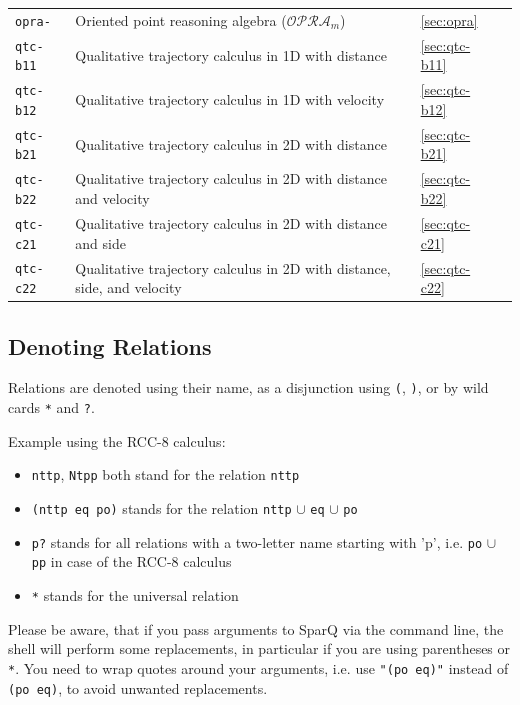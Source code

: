\documentclass[headsepline]{scrreprt}
\theoremstyle{definition}
\newcommand{\engine}{SparQ}
\newcommand{\opra}{$\mathcal{OPRA}_m$}
\begin{document}
\begin{center}
\begin{longtable}{|p{4cm}p{6cm}ll|}
	{\tt opra-} & Oriented point reasoning algebra (\opra{})\citep{moratz06_opra} & \ref{sec:opra} & \pageref{sec:opra}\\
	{\tt qtc-b11} & Qualitative trajectory calculus in 1D with distance \citep{Weghe04_PhD} & \ref{sec:qtc-b11} & \pageref{sec:qtc-b11}\\
	{\tt qtc-b12} & Qualitative trajectory calculus in 1D with velocity \citep{Weghe04_PhD} & \ref{sec:qtc-b12} & \pageref{sec:qtc-b12}\\
	{\tt qtc-b21} & Qualitative trajectory calculus in 2D with distance \citep{Weghe04_PhD} & \ref{sec:qtc-b21} & \pageref{sec:qtc-b21}\\
	{\tt qtc-b22} & Qualitative trajectory calculus in 2D with distance and velocity \citep{Weghe04_PhD} & \ref{sec:qtc-b22} & \pageref{sec:qtc-b22}\\
	{\tt qtc-c21} & Qualitative trajectory calculus in 2D with distance and side \citep{Weghe04_PhD} & \ref{sec:qtc-c21} & \pageref{sec:qtc-c21}\\
	{\tt qtc-c22} & Qualitative trajectory calculus in 2D with distance, side, and velocity \citep{Weghe04_PhD} & \ref{sec:qtc-c22} & \pageref{sec:qtc-c22}\\
	\hline
\end{longtable}
\end{center}
\renewcommand{\arraystretch}{1.0}


\subsection{Denoting Relations}
Relations are denoted using their name, as a disjunction using {\tt (}, {\tt )}, or by wild cards \verb=*= and \verb=?=.

\noindent Example using the RCC-8 calculus:\\
\begin{itemize}
	\item \verb=nttp=, \verb=Ntpp= both stand for the relation \verb=nttp=
	\item \verb=(nttp eq po)= stands for the relation \verb=nttp= $\cup$  \verb=eq= $\cup$  \verb=po=
	\item \verb=p?= stands for all relations with a two-letter name starting with 'p', i.e. \verb=po= $\cup$  \verb=pp= in case of the RCC-8 calculus
	\item \verb=*= stands for the universal relation
\end{itemize}

Please be aware, that if you pass arguments to \engine{} via the command line, the shell will perform some replacements, in particular if you are using parentheses or \verb=*=. You need to wrap quotes around your arguments, i.e. use \verb="(po eq)"= instead of \verb=(po eq)=, to avoid unwanted replacements.
\end{document}
